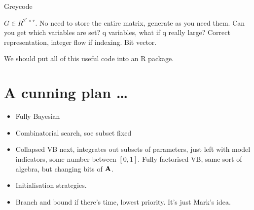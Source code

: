 \documentclass{amsart}
\begin{document}
Greycode

$G \in R^{2^r \times r}$. No need to store the entire matrix, generate as you need them. Can you get which
variables are set? q variables, what if q really large? Correct representation, integer flow if indexing. Bit
vector.

We should put all of this useful code into an R package.

\section{A cunning plan \ldots}
\begin{itemize}
\item Fully Bayesian
\item Combinatorial search, soe subset fixed
\item Collapsed VB next, integrates out subsets of parameters, just left with model indicators, some number 
			between $[0, 1]$. Fully factorised VB, same sort of algebra, but changing bits of ${\bf A}$.
\item Initialisation strategies.
\item Branch and bound if there's time, lowest priority. It's just Mark's idea.
\end{itemize}
\end{document}
